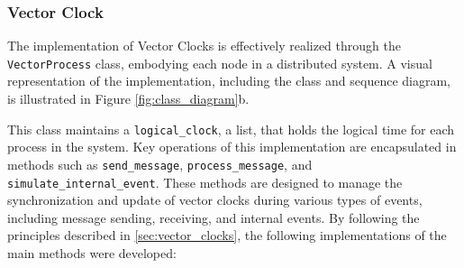 \documentclass{article}
\begin{document}
    \subsubsection{Vector Clock}
      The implementation of Vector Clocks is effectively realized through the \texttt{VectorProcess} class, embodying each node in a distributed system. A visual representation of the implementation, including the class and sequence diagram, is illustrated in Figure \ref*{fig:class_diagram}b.
      
      
      This class maintains a \texttt{logical\_clock}, a list, that holds the logical time for each process in the system. Key operations of this implementation are encapsulated in methods such as \texttt{send\_message}, \texttt{process\_message}, and \texttt{simulate\_internal\_event}. These methods are designed to manage the synchronization and update of vector clocks during various types of events, including message sending, receiving, and internal events.
      By following the principles described in \ref*{sec:vector_clocks}, the following implementations of the main methods were developed:
\end{document}
